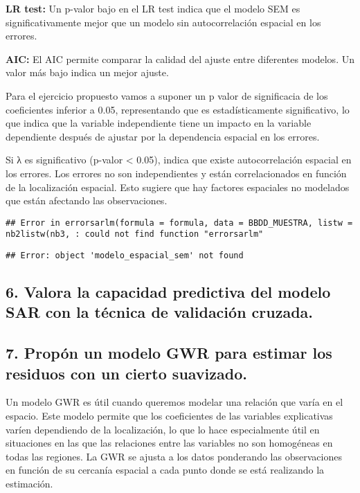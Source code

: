 \documentclass[
]{article}
\begin{document}
\textbf{LR test:} Un p-valor bajo en el LR test indica que el modelo SEM
es significativamente mejor que un modelo sin autocorrelación espacial
en los errores.

\textbf{AIC:} El AIC permite comparar la calidad del ajuste entre
diferentes modelos. Un valor más bajo indica un mejor ajuste.

Para el ejercicio propuesto vamos a suponer un p valor de significacia
de los coeficientes inferior a 0.05, representando que es
estadísticamente significativo, lo que indica que la variable
independiente tiene un impacto en la variable dependiente después de
ajustar por la dependencia espacial en los errores.

Si λ es significativo (p-valor \textless{} 0.05), indica que existe
autocorrelación espacial en los errores. Los errores no son
independientes y están correlacionados en función de la localización
espacial. Esto sugiere que hay factores espaciales no modelados que
están afectando las observaciones.

\begin{verbatim}
## Error in errorsarlm(formula = formula, data = BBDD_MUESTRA, listw = nb2listw(nb3, : could not find function "errorsarlm"
\end{verbatim}

\begin{verbatim}
## Error: object 'modelo_espacial_sem' not found
\end{verbatim}

\subsection{6. Valora la capacidad predictiva del modelo SAR con la
técnica de validación
cruzada.}\label{valora-la-capacidad-predictiva-del-modelo-sar-con-la-tuxe9cnica-de-validaciuxf3n-cruzada.}

\subsection{7. Propón un modelo GWR para estimar los residuos con un
cierto
suavizado.}\label{propuxf3n-un-modelo-gwr-para-estimar-los-residuos-con-un-cierto-suavizado.}

Un modelo GWR es útil cuando queremos modelar una relación que varía en
el espacio. Este modelo permite que los coeficientes de las variables
explicativas varíen dependiendo de la localización, lo que lo hace
especialmente útil en situaciones en las que las relaciones entre las
variables no son homogéneas en todas las regiones. La GWR se ajusta a
los datos ponderando las observaciones en función de su cercanía
espacial a cada punto donde se está realizando la estimación.
\end{document}
